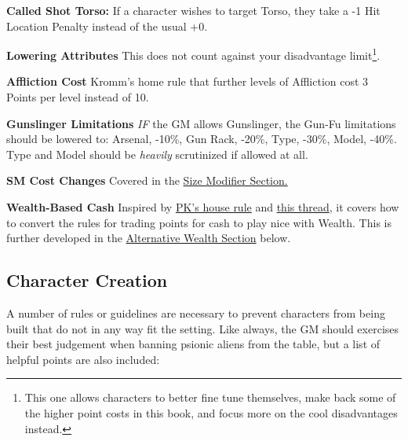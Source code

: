\begin{multicols*}{3}
	\textbf{Called Shot Torso:} If a character wishes to target Torso, they take a -1 Hit Location Penalty instead of the usual +0.
	
	\textbf{Lowering Attributes} This does not count against your disadvantage limit\footnote{This one allows characters to better fine tune themselves, make back some of the higher point costs in this book, and focus more on the cool disadvantages instead.}.
	
	\textbf{Affliction Cost} Kromm's home rule that further levels of Affliction cost 3 Points per level instead of 10.
	
	\textbf{Gunslinger Limitations} \textit{IF} the GM allows Gunslinger, the Gun-Fu limitations should be lowered to: Arsenal, -10\%, Gun Rack, -20\%, Type, -30\%, Model, -40\%. Type and Model should be \textit{heavily} scrutinized if allowed at all.
	
	\textbf{SM Cost Changes} Covered in the \hyperref[size_modifier]{Size Modifier Section.}
	
	\textbf{Wealth-Based Cash} Inspired by \textcolor{blue}{\href{https://www.mygurps.com/index.php?n=Main.GURPSMoney}{PK's house rule}} and \textcolor{blue}{\href{https://forums.sjgames.com/showpost.php?p=750563&postcount=55}{this thread}}, it covers how to convert the rules for trading points for cash to play nice with Wealth. This is further developed in the \hyperref[wealth]{Alternative Wealth Section} below.
	
	\subsection{Character Creation}
	
	A number of rules or guidelines are necessary to prevent characters from being built that do not in any way fit the setting. Like always, the GM should exercises their best judgement when banning psionic aliens from the table, but a list of helpful points are also included:
	

\end{multicols*}
